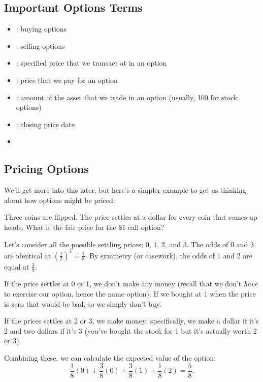 \subsection{Important Options Terms}%
\label{sub:Important Options Terms}
\begin{itemize}
    \item {}: buying options
    \item {}: selling options
    \item {}: specified price that we transact at in an option
    \item {}: price that we pay for an option
    \item {}: amount of the asset that we trade in an option (usually, 100 for stock options)
    \item {}: closing price date
    \item %
\end{itemize}

\subsection{Pricing Options}%
\label{sub:Pricing Options}
We'll get more into this later, but here's a simpler example to get us thinking about how options might be priced:

\begin{example}
    Three coins are flipped. The price settles at a dollar for every coin that comes up heads. What is the fair price for the \$1 call option?

    \begin{solution}
        Let's consider all the possible settling prices: 0, 1, 2, and 3. The odds of 0 and 3 are identical at $ \left( \frac{1}{2} \right) ^3 = \frac{1}{8} $. By symmetry (or casework), the odds of 1 and 2 are equal at $ \frac{3}{8} $. 
        
        If the price settles at 0 or 1, we don't make any money (recall that we don't \textit{have} to exercise our option, hence the name option). If we bought at 1 when the price is zero that would be bad, so we simply don't buy. 

        If the prices settles at 2 or 3, we make money; specifically, we make a dollar if it's 2 and two dollars if it's 3 (you've bought the stock for 1 but it's actually worth 2 or 3).

        Combining these, we can calculate the expected value of the option: 
        \begin{equation*}
            \frac{1}{8}(0) + \frac{3}{8}(0) + \frac{3}{8}(1) + \frac{1}{8}(2) = \boxed{\frac{5}{8}}.
        \end{equation*}
        
    \end{solution}
    
\end{example}


